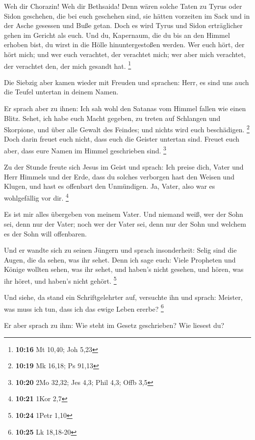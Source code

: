  Weh dir Chorazin! Weh dir Bethsaida! Denn wären solche
Taten zu Tyrus oder Sidon geschehen, die bei euch geschehen sind, sie
hätten vorzeiten im Sack und in der Asche gesessen und Buße getan.
 Doch es wird Tyrus und Sidon erträglicher gehen im Gericht
als euch.  Und du, Kapernaum, die du bis an den Himmel
erhoben bist, du wirst in die Hölle hinuntergestoßen werden.
 Wer euch hört, der hört mich; und wer euch verachtet, der
verachtet mich; wer aber mich verachtet, der verachtet den, der mich
gesandt hat. \footnote{\textbf{10:16} Mt 10,40; Joh 5,23}

 Die Siebzig aber kamen wieder mit Freuden und sprachen:
Herr, es sind uns auch die Teufel untertan in deinem Namen.

 Er sprach aber zu ihnen: Ich sah wohl den Satanas vom
Himmel fallen wie einen Blitz.  Sehet, ich habe euch Macht
gegeben, zu treten auf Schlangen und Skorpione, und über alle Gewalt des
Feindes; und nichts wird euch beschädigen. \footnote{\textbf{10:19} Mk
  16,18; Ps 91,13}  Doch darin freuet euch nicht, dass euch
die Geister untertan sind. Freuet euch aber, dass eure Namen im Himmel
geschrieben sind. \footnote{\textbf{10:20} 2Mo 32,32; Jes 4,3; Phil 4,3;
  Offb 3,5}

 Zu der Stunde freute sich Jesus im Geist und sprach: Ich
preise dich, Vater und Herr Himmels und der Erde, dass du solches
verborgen hast den Weisen und Klugen, und hast es offenbart den
Unmündigen. Ja, Vater, also war es wohlgefällig vor dir. \footnote{\textbf{10:21}
  1Kor 2,7}

 Es ist mir alles übergeben von meinem Vater. Und niemand
weiß, wer der Sohn sei, denn nur der Vater; noch wer der Vater sei, denn
nur der Sohn und welchem es der Sohn will offenbaren.

 Und er wandte sich zu seinen Jüngern und sprach
insonderheit: Selig sind die Augen, die da sehen, was ihr sehet.
 Denn ich sage euch: Viele Propheten und Könige wollten
sehen, was ihr sehet, und haben's nicht gesehen, und hören, was ihr
höret, und haben's nicht gehört. \footnote{\textbf{10:24} 1Petr 1,10}

 Und siehe, da stand ein Schriftgelehrter auf, versuchte
ihn und sprach: Meister, was muss ich tun, dass ich das ewige Leben
ererbe? \footnote{\textbf{10:25} Lk 18,18-20}

 Er aber sprach zu ihm: Wie steht im Gesetz geschrieben?
Wie liesest du?

